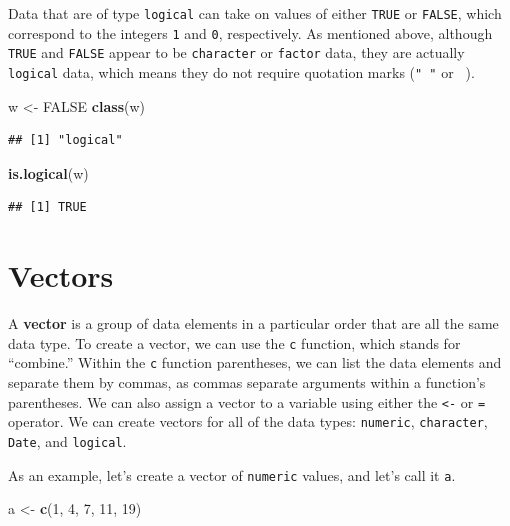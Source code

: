 \documentclass[]{book}
\newenvironment{Shaded}{\begin{snugshade}}{\end{snugshade}}
\newcommand{\KeywordTok}[1]{\textcolor[rgb]{0.13,0.29,0.53}{\textbf{#1}}}
\newcommand{\DecValTok}[1]{\textcolor[rgb]{0.00,0.00,0.81}{#1}}
\newcommand{\StringTok}[1]{\textcolor[rgb]{0.31,0.60,0.02}{#1}}
\newcommand{\OtherTok}[1]{\textcolor[rgb]{0.56,0.35,0.01}{#1}}
\newcommand{\NormalTok}[1]{#1}
\begin{document}
Data that are of type \texttt{logical} can take on values of either
\texttt{TRUE} or \texttt{FALSE}, which correspond to the integers
\texttt{1} and \texttt{0}, respectively. As mentioned above, although
\texttt{TRUE} and \texttt{FALSE} appear to be \texttt{character} or
\texttt{factor} data, they are actually \texttt{logical} data, which
means they do not require quotation marks (\texttt{"\ "} or
\texttt{\textquotesingle{}\ \textquotesingle{}}).

\begin{Shaded}
\begin{Highlighting}[]
\NormalTok{w <-}\StringTok{ }\OtherTok{FALSE}
\KeywordTok{class}\NormalTok{(w)}
\end{Highlighting}
\end{Shaded}

\begin{verbatim}
## [1] "logical"
\end{verbatim}

\begin{Shaded}
\begin{Highlighting}[]
\KeywordTok{is.logical}\NormalTok{(w)}
\end{Highlighting}
\end{Shaded}

\begin{verbatim}
## [1] TRUE
\end{verbatim}

\section{Vectors}\label{vectors}

A \textbf{vector} is a group of data elements in a particular order that
are all the same data type. To create a vector, we can use the
\texttt{c} function, which stands for ``combine.'' Within the \texttt{c}
function parentheses, we can list the data elements and separate them by
commas, as commas separate arguments within a function's parentheses. We
can also assign a vector to a variable using either the
\texttt{\textless{}-} or \texttt{=} operator. We can create vectors for
all of the data types: \texttt{numeric}, \texttt{character},
\texttt{Date}, and \texttt{logical}.

As an example, let's create a vector of \texttt{numeric} values, and
let's call it \texttt{a}.

\begin{Shaded}
\begin{Highlighting}[]
\NormalTok{a <-}\StringTok{ }\KeywordTok{c}\NormalTok{(}\DecValTok{1}\NormalTok{, }\DecValTok{4}\NormalTok{, }\DecValTok{7}\NormalTok{, }\DecValTok{11}\NormalTok{, }\DecValTok{19}\NormalTok{)}
\end{Highlighting}
\end{Shaded}
\end{document}
